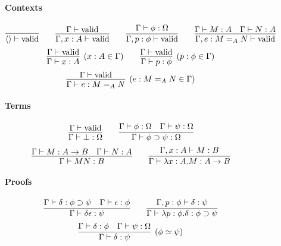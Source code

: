 \newcommand{\RvarT}{\ensuremath(\mathsf{varT})}
\begin{figure}
\begin{framed}
\paragraph{Contexts}
\[ \infer{\langle \rangle \vald}{} \qquad
\infer{\Gamma, x : A \vald}{\Gamma \vald} \qquad 
\infer{\Gamma, p : \phi \vald}{\Gamma \vdash \phi : \Omega} \qquad
\infer{\Gamma, e : M =_A N \vald}{\Gamma \vdash M : A \quad \Gamma \vdash N : A} \]
\[ \infer[(x : A \in \Gamma)]{\Gamma \vdash x : A}{\Gamma \vald} \qquad
\infer[(p : \phi \in \Gamma)]{\Gamma \vdash p : \phi}{\Gamma \vald} \]
\[ \infer[(e : M =_A N \in \Gamma)]{\Gamma \vdash e : M =_A N}{\Gamma \vald} \]

\paragraph{Terms}
\[ \infer{\Gamma \vdash \bot : \Omega}{\Gamma \vald} \qquad
\infer{\Gamma \vdash \phi \supset \psi : \Omega}{\Gamma \vdash \phi : \Omega \quad \Gamma \vdash \psi : \Omega} \]
\[ \infer{\Gamma \vdash M N : B} {\Gamma \vdash M : A \rightarrow B \quad \Gamma \vdash N : A} \qquad
\infer{\Gamma \vdash \lambda x:A.M : A \rightarrow B}{\Gamma, x : A \vdash M : B} \]

\paragraph{Proofs}
\[ \infer{\Gamma \vdash \delta \epsilon : \psi} {\Gamma \vdash \delta : \phi \supset \psi \quad \Gamma \vdash \epsilon : \phi} \qquad
\infer{\Gamma \vdash \lambda p : \phi . \delta : \phi \supset \psi}{\Gamma, p : \phi \vdash \delta : \psi} \]
\[ \infer[(\phi \simeq \psi)]{\Gamma \vdash \delta : \psi}{\Gamma \vdash \delta : \phi \quad \Gamma \vdash \psi : \Omega} \]


\end{framed}
\end{figure}
